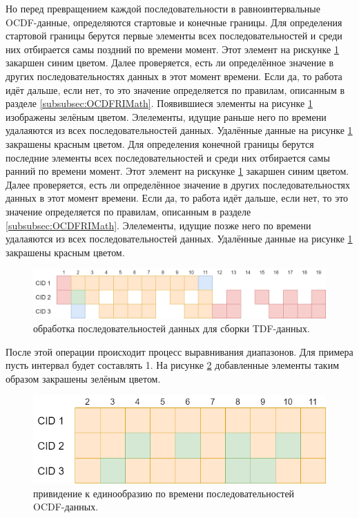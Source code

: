 {  \par Но перед превращением каждой последовательности в равноинтервальные OCDF-данные, определяются стартовые и конечные границы. Для определения стартовой границы берутся первые элементы всех последовательностей и среди них отбирается самы поздний по времени момент. Этот элемент на рискунке \ref{fig:CreateTDFstage2} закаршен синим цветом. Далее проверяется, есть ли определённое значение в других последовательностях данных в этот момент времени. Если да, то работа идёт дальше, если нет, то это значение определяется по правилам, описанным в разделе \ref{subsubsec:OCDFRIMath}. Появившиеся элементы на рисунке \ref{fig:CreateTDFstage2} изображены зелёным цветом. Элелементы, идущие раньше него по времени удалаяются из всех последовательностей данных. Удалённые данные на рисунке \ref{fig:CreateTDFstage2} закрашены красным цветом. Для определения конечной границы берутся последние элементы всех последовательностей и среди них отбирается самы ранний по времени момент. Этот элемент на рискунке \ref{fig:CreateTDFstage2} закаршен синим цветом. Далее проверяется, есть ли определённое значение в других последовательностях данных в этот момент времени. Если да, то работа идёт дальше, если нет, то это значение определяется по правилам, описанным в разделе \ref{subsubsec:OCDFRIMath}. Элелементы, идущие позже него по времени удалаяются из всех последовательностей данных. Удалённые данные на рисунке \ref{fig:CreateTDFstage2} закрашены красным цветом.

  \begin{figure}[H]
    \centering
    \includegraphics[width=\textwidth]{images/forDataManipulator/CreateTDFstage2.drawio.png}
    \caption{обработка последовательностей данных для сборки TDF-данных.} 
    \label{fig:CreateTDFstage2}
  \end{figure}

  \par После этой операции происходит процесс выравнивания диапазонов. Для примера пусть интервал будет составлять 1. На рисунке \ref{fig:CreateTDFstage3} добавленные элементы таким образом закрашены зелёным цветом. 

  \begin{figure}[H]
    \centering
    \includegraphics[width=\textwidth]{images/forDataManipulator/CreateTDFstage3.drawio.png}
    \caption{привидение к единообразию по времени последовательностей OCDF-данных.} 
    \label{fig:CreateTDFstage3}
  \end{figure}

}

